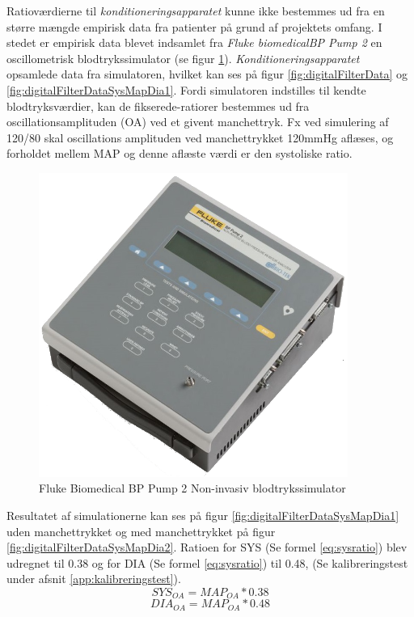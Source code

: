 \begin{minipage}[c]{0.5\textwidth}
	Ratioværdierne til \textit{konditioneringsapparatet} kunne ikke bestemmes ud fra en større mængde empirisk data fra patienter på grund af projektets omfang. I stedet er empirisk data blevet indsamlet fra\textit{ Fluke biomedicalBP Pump 2} en oscillometrisk blodtrykssimulator (se figur \ref{fig:TheFlukeBiomedicalBPPump2L}). \textit{Konditioneringsapparatet} opsamlede data fra simulatoren, hvilket kan ses på figur \ref{fig:digitalFilterData} og \ref{fig:digitalFilterDataSysMapDia1}. Fordi simulatoren indstilles til kendte blodtryksværdier, kan de fikserede-ratiorer bestemmes ud fra oscillationsamplituden (OA) ved et givent manchettryk. Fx ved simulering af 120/80 skal oscillations amplituden ved manchettrykket 120mmHg aflæses, og forholdet mellem MAP og denne aflæste værdi er den systoliske ratio.
	
	
\end{minipage}
\begin{minipage}[c]{0.5\textwidth}
	\begin{figure}[H]
		\centering
		\includegraphics[trim={0 0 0 0},clip, width=0.9\textwidth]{billeder/TheFlukeBiomedicalBPPump2L.png}	
		\parbox{7cm}{\caption{Fluke Biomedical BP Pump 2 Non-invasiv blodtrykssimulator}\label{fig:TheFlukeBiomedicalBPPump2L}}
	\end{figure}
\end{minipage}

Resultatet af simulationerne kan ses på figur \ref{fig:digitalFilterDataSysMapDia1} uden manchettrykket og med manchettrykket på figur \ref{fig:digitalFilterDataSysMapDia2}. Ratioen for SYS (Se formel \ref{eq:sysratio}) blev udregnet til 0.38 og for DIA (Se formel \ref{eq:sysratio}) til 0.48, (Se kalibreringstest under afsnit \ref{app:kalibreringstest}). 
	\begin{equation}
	SYS_{OA}=MAP_{OA}*0.38
	\label{eq:sysratio}
	\end{equation}
	\begin{equation}
	DIA_{OA}=MAP_{OA}*0.48
	\label{eq:diaratio}
	\end{equation}

